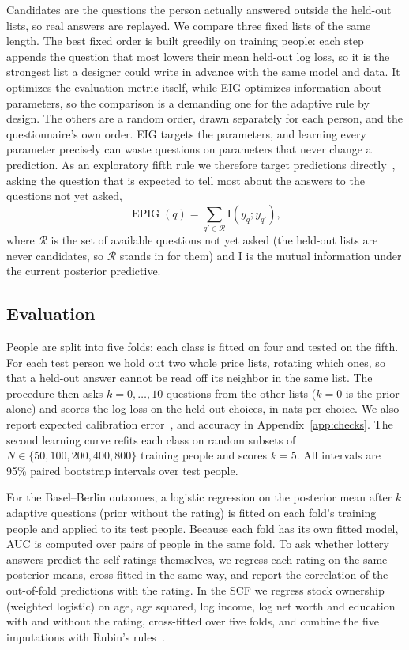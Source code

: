 \documentclass{article}
\begin{document}
Candidates are the questions the person actually answered outside the held-out lists, so real answers are replayed. We compare three fixed lists of the same length. The best fixed order is built greedily on training people: each step appends the question that most lowers their mean held-out log loss, so it is the strongest list a designer could write in advance with the same model and data. It optimizes the evaluation metric itself, while EIG optimizes information about parameters, so the comparison is a demanding one for the adaptive rule by design. The others are a random order, drawn separately for each person, and the questionnaire's own order. EIG targets the parameters, and learning every parameter precisely can waste questions on parameters that never change a prediction. As an exploratory fifth rule we therefore target predictions directly~\citep{bickfordsmith2023}, asking the question that is expected to tell most about the answers to the questions not yet asked,
\begin{equation}
  \operatorname{EPIG}(q) = \sum_{q' \in \mathcal{R}} \mathrm{I}(y_q; y_{q'}),
\end{equation}
where $\mathcal{R}$ is the set of available questions not yet asked (the held-out lists are never candidates, so $\mathcal{R}$ stands in for them) and $\mathrm{I}$ is the mutual information under the current posterior predictive.

\subsection{Evaluation}
People are split into five folds; each class is fitted on four and tested on the fifth. For each test person we hold out two whole price lists, rotating which ones, so that a held-out answer cannot be read off its neighbor in the same list. The procedure then asks $k = 0, \dots, 10$ questions from the other lists ($k = 0$ is the prior alone) and scores the log loss on the held-out choices, in nats per choice. We also report expected calibration error~\citep{guo2017}, and accuracy in Appendix~\ref{app:checks}. The second learning curve refits each class on random subsets of $N \in \{50, 100, 200, 400, 800\}$ training people and scores $k = 5$. All intervals are 95\% paired bootstrap intervals over test people.

For the Basel--Berlin outcomes, a logistic regression on the posterior mean after $k$ adaptive questions (prior without the rating) is fitted on each fold's training people and applied to its test people. Because each fold has its own fitted model, AUC is computed over pairs of people in the same fold. To ask whether lottery answers predict the self-ratings themselves, we regress each rating on the same posterior means, cross-fitted in the same way, and report the correlation of the out-of-fold predictions with the rating. In the SCF we regress stock ownership (weighted logistic) on age, age squared, log income, log net worth and education with and without the rating, cross-fitted over five folds, and combine the five imputations with Rubin's rules~\citep{rubin1987}.
\end{document}
